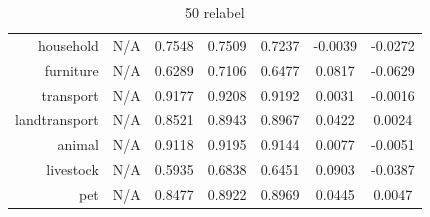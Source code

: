 \documentclass[11pt,a4paper]{article}
\begin{document}
\begin{table}[htbp]
\begin{tabular}{r|c|c|c|c|c|c}
household     & N/A    & 0.7548 & 0.7509 & 0.7237 & -0.0039 & -0.0272\\
furniture     & N/A    & 0.6289 & 0.7106 & 0.6477 & 0.0817 & -0.0629\\
transport     & N/A    & 0.9177 & 0.9208 & 0.9192 & 0.0031 & -0.0016\\
landtransport & N/A    & 0.8521 & 0.8943 & 0.8967 & 0.0422 & 0.0024\\
animal        & N/A    & 0.9118 & 0.9195 & 0.9144 & 0.0077 & -0.0051\\
livestock     & N/A    & 0.5935 & 0.6838 & 0.6451 & 0.0903 & -0.0387\\
pet           & N/A    & 0.8477 & 0.8922 & 0.8969 & 0.0445 & 0.0047
\end{tabular}
\caption{50 relabel}
\label{tab:svm50acc}
\end{table}
\end{document}
